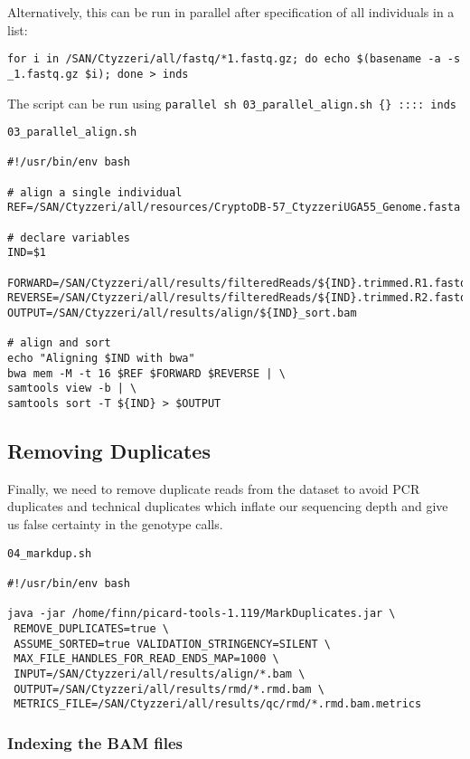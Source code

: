 \documentclass[
]{article}
\begin{document}
Alternatively, this can be run in parallel after specification of all
individuals in a list:

\begin{verbatim}
for i in /SAN/Ctyzzeri/all/fastq/*1.fastq.gz; do echo $(basename -a -s _1.fastq.gz $i); done > inds
\end{verbatim}

The script can be run using
\texttt{parallel\ \textquotesingle{}sh\ 03\_parallel\_align.sh\ \{\}\textquotesingle{}\ ::::\ inds}

\begin{verbatim}
03_parallel_align.sh

#!/usr/bin/env bash

# align a single individual
REF=/SAN/Ctyzzeri/all/resources/CryptoDB-57_CtyzzeriUGA55_Genome.fasta

# declare variables
IND=$1

FORWARD=/SAN/Ctyzzeri/all/results/filteredReads/${IND}.trimmed.R1.fastq.gz
REVERSE=/SAN/Ctyzzeri/all/results/filteredReads/${IND}.trimmed.R2.fastq.gz
OUTPUT=/SAN/Ctyzzeri/all/results/align/${IND}_sort.bam

# align and sort
echo "Aligning $IND with bwa"
bwa mem -M -t 16 $REF $FORWARD $REVERSE | \
samtools view -b | \
samtools sort -T ${IND} > $OUTPUT
\end{verbatim}

\hypertarget{removing-duplicates}{%
\subsection{Removing Duplicates}\label{removing-duplicates}}

Finally, we need to remove duplicate reads from the dataset to avoid PCR
duplicates and technical duplicates which inflate our sequencing depth
and give us false certainty in the genotype calls.

\begin{verbatim}
04_markdup.sh

#!/usr/bin/env bash

java -jar /home/finn/picard-tools-1.119/MarkDuplicates.jar \
 REMOVE_DUPLICATES=true \
 ASSUME_SORTED=true VALIDATION_STRINGENCY=SILENT \
 MAX_FILE_HANDLES_FOR_READ_ENDS_MAP=1000 \
 INPUT=/SAN/Ctyzzeri/all/results/align/*.bam \
 OUTPUT=/SAN/Ctyzzeri/all/results/rmd/*.rmd.bam \
 METRICS_FILE=/SAN/Ctyzzeri/all/results/qc/rmd/*.rmd.bam.metrics
\end{verbatim}

\hypertarget{indexing-the-bam-files}{%
\subsubsection{Indexing the BAM files}\label{indexing-the-bam-files}}
\end{document}

